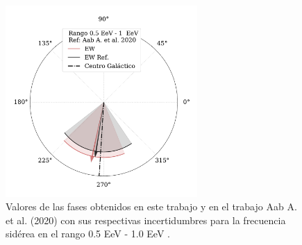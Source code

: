     \begin{figure}[H]
        \begin{small}
            \begin{center}
                \vspace*{-0.65 cm}
                \includegraphics[width=0.65\textwidth]{phase_segundo_bin_v3.pdf}
                \vspace*{-1.1 cm}
            \end{center}
            \caption{Valores de las fases obtenidos en este trabajo y en el trabajo Aab A.  et al. (2020) \cite{Aab_2020} con sus respectivas incertidumbres para la frecuencia sidérea en el rango 0.5 EeV - 1.0 EeV .}
            \label{fig:segundo}
        \end{small}
    \end{figure}


